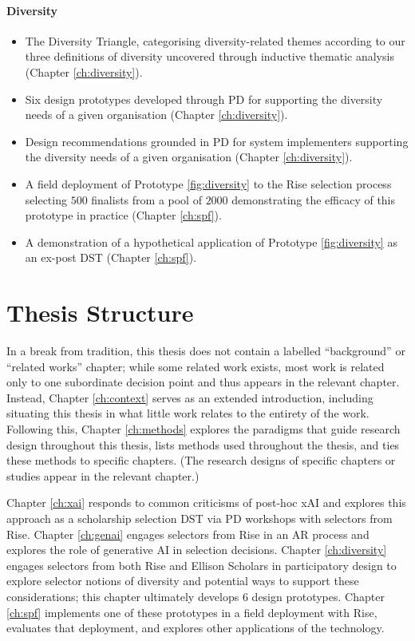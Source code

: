\paragraph{Diversity}
\begin{itemize}
    \item The Diversity Triangle, categorising diversity-related themes according to our three definitions of diversity uncovered through inductive thematic analysis (Chapter \ref{ch:diversity}).
    \item Six design prototypes developed through PD for supporting the diversity needs of a given organisation (Chapter \ref{ch:diversity}).
    \item Design recommendations grounded in PD for system implementers supporting the diversity needs of a given organisation (Chapter \ref{ch:diversity}).
    \item A field deployment of Prototype \ref{fig:diversity} to the Rise selection process selecting $500$ finalists from a pool of $2000$ demonstrating the efficacy of this prototype in practice (Chapter \ref{ch:spf}).
    \item A demonstration of a hypothetical application of Prototype \ref{fig:diversity} as an ex-post DST (Chapter \ref{ch:spf}).
\end{itemize}

\section{Thesis Structure}
In a break from tradition, this thesis does not contain a labelled ``background'' or ``related works'' chapter; while some related work exists, most work is related only to one subordinate decision point and thus appears in the relevant chapter. Instead, Chapter \ref{ch:context} serves as an extended introduction, including situating this thesis in what little work relates to the entirety of the work. Following this, Chapter \ref{ch:methods} explores the paradigms that guide research design throughout this thesis, lists methods used throughout the thesis, and ties these methods to specific chapters. (The research designs of specific chapters or studies appear in the relevant chapter.)

Chapter \ref{ch:xai} responds to common criticisms of post-hoc xAI and explores this approach as a scholarship selection DST via PD workshops with selectors from Rise. Chapter \ref{ch:genai} engages selectors from Rise in an AR process and explores the role of generative AI in selection decisions. Chapter \ref{ch:diversity} engages selectors from both Rise and Ellison Scholars in participatory design to explore selector notions of diversity and potential ways to support these considerations; this chapter ultimately develops 6 design prototypes. Chapter \ref{ch:spf} implements one of these prototypes in a field deployment with Rise, evaluates that deployment, and explores other applications of the technology.

